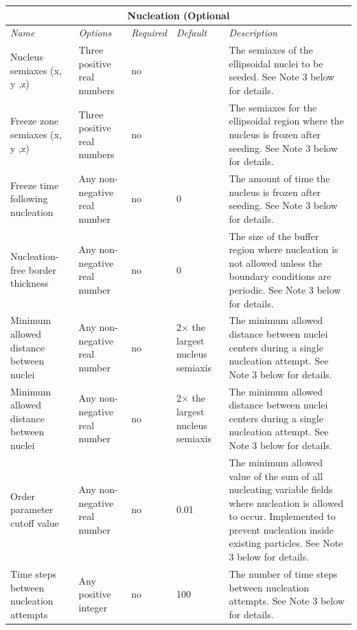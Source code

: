 \documentclass[10pt]{article} %
\begin{document}
\begin{center}
    \begin{tabular}{ | p{} | p{} | p{} | p{} | p{} |}
    \hline
      \multicolumn{5}{|c|}{\textbf{Nucleation (Optional}} \\
    \hline
    \hline
    \emph{Name} & \emph{Options} & \emph{Required} & \emph{Default} & \emph{Description} \\ \hline
    Nucleus semiaxes (x, y ,z) & Three positive real numbers & no &  & The semiaxes of the ellipsoidal nuclei to be seeded. See Note 3 below for details. \\ \hline
     Freeze zone semiaxes (x, y ,z) & Three positive real numbers & no &  & The semiaxes for the ellipsoidal region where the nucleus is frozen after seeding. See Note 3 below for details.  \\ \hline
      Freeze time following nucleation & Any non-negative real number & no & 0 & The amount of time the nucleus is frozen after seeding. See Note 3 below for details. \\ \hline
      Nucleation-free border thickness & Any non-negative real number & no & 0 & The size of the buffer region where nucleation is not allowed unless the boundary conditions are periodic. See Note 3 below for details. \\ \hline
      Minimum allowed distance between nuclei & Any non-negative real number & no & 2$\times$ the largest nucleus semiaxis  & The minimum allowed distance between nuclei centers during a single nucleation attempt. See Note 3 below for details. \\ \hline
      Minimum allowed distance between nuclei & Any non-negative real number & no & 2$\times$ the largest nucleus semiaxis  & The minimum allowed distance between nuclei centers during a single nucleation attempt. See Note 3 below for details. \\ \hline
      Order parameter cutoff value & Any non-negative real number & no & 0.01  & The minimum allowed value of the sum of all nucleating variable fields where nucleation is allowed to occur. Implemented to prevent nucleation inside existing particles. See Note 3 below for details. \\ \hline
      Time steps between nucleation attempts & Any positive integer & no & 100  & The number of time steps between nucleation attempts. See Note 3 below for details. \\ \hline
    \end{tabular}
\end{center}
\end{document}
